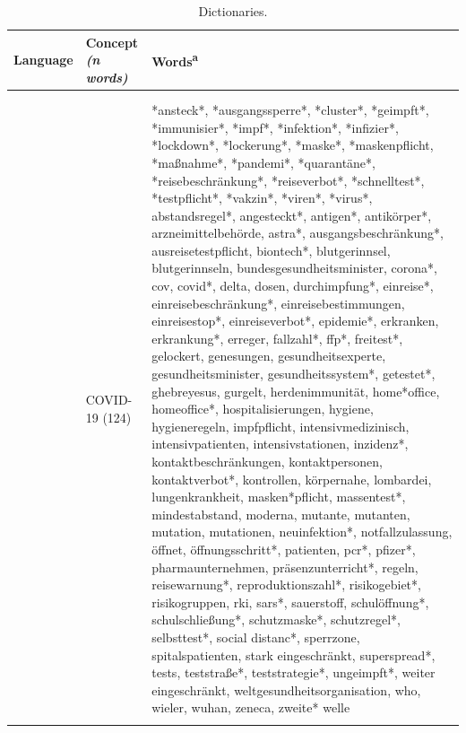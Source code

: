 \documentclass[
]{ccr}
\begin{document}
{
\begin{spacing}{.9}
\fontsize{8}{9}\selectfont 
\begin{longtable}[]{@{}
  >{\raggedright\arraybackslash}p{.09\linewidth}
  >{\raggedright\arraybackslash}p{.12\linewidth}
  >{\raggedright\arraybackslash}p{.71\linewidth}@{}}
\caption{Dictionaries.} \\
\toprule\noalign{}
\textbf{Language} & \textbf{Concept} \newline \emph{(n words)} & \textbf{Words}\textsuperscript{a} \\
\midrule\noalign{}
\endhead
\endlastfoot 
\begin{minipage}[t]{\linewidth}\raggedright
DE\\
\strut \\
\strut
\end{minipage} & COVID-19 (124) & *ansteck*, *ausgangssperre*,
*cluster*, *geimpft*, *immunisier*, *impf*, *infektion*, *infizier*,
*lockdown*, *lockerung*, *maske*, *maskenpflicht, *maßnahme*, *pandemi*,
*quarantäne*, *reisebeschränkung*, *reiseverbot*, *schnelltest*,
*testpflicht*, *vakzin*, *viren*, *virus*, abstandsregel*, angesteckt*,
antigen*, antikörper*, arzneimittelbehörde, astra*,
ausgangsbeschränkung*, ausreisetestpflicht, biontech*, blutgerinnsel,
blutgerinnseln, bundesgesundheitsminister, corona*, cov, covid*, delta,
dosen, durchimpfung*, einreise*, einreisebeschränkung*,
einreisebestimmungen, einreisestop*, einreiseverbot*, epidemie*,
erkranken, erkrankung*, erreger, fallzahl*, ffp*, freitest*, gelockert,
genesungen, gesundheitsexperte, gesundheitsminister, gesundheitssystem*,
getestet*, ghebreyesus, gurgelt, herdenimmunität, home*office,
homeoffice*, hospitalisierungen, hygiene, hygieneregeln, impfpflicht,
intensivmedizinisch, intensivpatienten, intensivstationen, inzidenz*,
kontaktbeschränkungen, kontaktpersonen, kontaktverbot*, kontrollen,
körpernahe, lombardei, lungenkrankheit, masken*pflicht, massentest*,
mindestabstand, moderna, mutante, mutanten, mutation, mutationen,
neuinfektion*, notfallzulassung, öffnet, öffnungsschritt*, patienten,
pcr*, pfizer*, pharmaunternehmen, präsenzunterricht*, regeln,
reisewarnung*, reproduktionszahl*, risikogebiet*, risikogruppen, rki,
sars*, sauerstoff, schulöffnung*, schulschließung*, schutzmaske*,
schutzregel*, selbsttest*, social distanc*, sperrzone, spitalspatienten,
stark eingeschränkt, superspread*, tests, teststraße*, teststrategie*,
ungeimpft*, weiter eingeschränkt, weltgesundheitsorganisation, who,
wieler, wuhan, zeneca, zweite* welle \\ \cline{2-3}


\end{longtable}
\end{spacing}}
\end{document}

